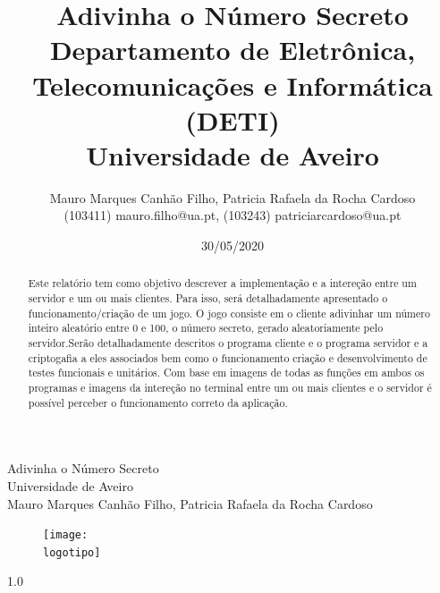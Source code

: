 \documentclass{report}
\begin{document}
%
\def\titulo{Adivinha o Número Secreto}
\def\data{30/05/2020}
\def\autores{Mauro Marques Canhão Filho, Patricia Rafaela da Rocha Cardoso }
\def\autorescontactos{(103411) mauro.filho@ua.pt, (103243) patriciarcardoso@ua.pt}
\def\versao{1.0}
\def\departamento{Departamento de Eletrônica, Telecomunicações e Informática (DETI)}
\def\empresa{Universidade de Aveiro}
\def\logotipo{ua.pdf}
%
%
\renewcommand{\contentsname}{Índice}
\begin{titlepage}

\begin{center}
%
\vspace*{50mm}
%
{\Huge \titulo}\\ 
%
\vspace{10mm}
%
{\Large \empresa}\\
%
\vspace{10mm}
%
{\LARGE \autores}\\ 
%
\vspace{30mm}
%
\begin{figure}[h]
\center
\texttt{[image: \\logotipo]}
\end{figure}
%
\vspace{30mm}
\end{center}
%
\begin{flushright}
\versao
\end{flushright}
\end{titlepage}

\title{%
{\Huge\textbf{\titulo}}\\
{\Large \departamento\\ \empresa}
}
%
\author{%
    \autores \\
    \autorescontactos
}
%
\date{\data}
%
\maketitle


\begin{abstract}
Este relatório tem como objetivo descrever a implementação e a intereção entre um servidor e um ou mais clientes. Para isso, será detalhadamente apresentado o funcionamento/criação de um jogo. O jogo consiste em o cliente adivinhar um número inteiro aleatório entre 0 e 100, o número secreto, gerado aleatoriamente pelo servidor.Serão detalhadamente descritos o programa cliente e o programa servidor e a criptogafia a eles associados bem como o funcionamento criação e desenvolvimento de testes funcionais e unitários. Com base em imagens de todas as funções em ambos os programas e imagens da intereção no terminal entre um ou mais clientes e o servidor é possível perceber o funcionamento correto da aplicação.
\end{abstract}
\end{document}
